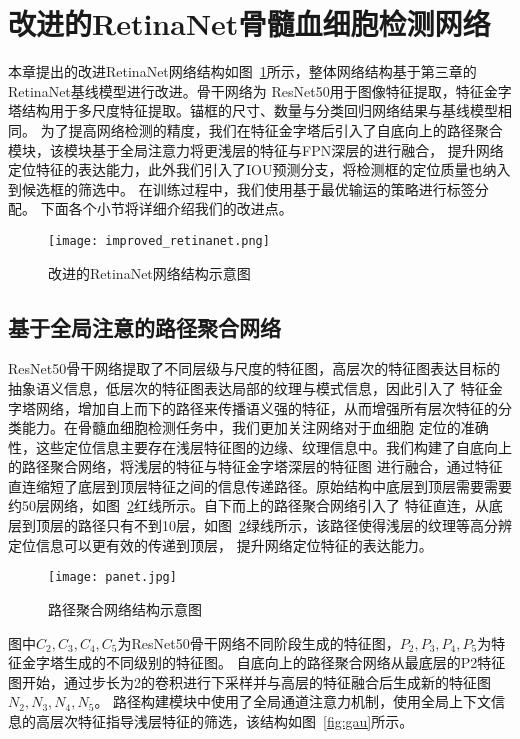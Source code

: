 \section{改进的RetinaNet骨髓血细胞检测网络}
本章提出的改进RetinaNet网络结构如图~\ref{fig:improved_retinanet}所示，整体网络结构基于第三章的RetinaNet基线模型进行改进。骨干网络为
ResNet50用于图像特征提取，特征金字塔结构用于多尺度特征提取。锚框的尺寸、数量与分类回归网络结果与基线模型相同。
为了提高网络检测的精度，我们在特征金字塔后引入了自底向上的路径聚合模块，该模块基于全局注意力将更浅层的特征与FPN深层的进行融合，
提升网络定位特征的表达能力，此外我们引入了IOU预测分支，将检测框的定位质量也纳入到候选框的筛选中。
在训练过程中，我们使用基于最优输运的策略进行标签分配。
下面各个小节将详细介绍我们的改进点。
\begin{figure}[htbp]                     
  \centering                      
  \texttt{[image: improved\_retinanet.png]}                      
  \caption{改进的RetinaNet网络结构示意图}                      
  \label{fig:improved_retinanet}       
\end{figure}  

\subsection{基于全局注意的路径聚合网络}
ResNet50骨干网络提取了不同层级与尺度的特征图，高层次的特征图表达目标的抽象语义信息，低层次的特征图表达局部的纹理与模式信息，因此引入了
特征金字塔网络，增加自上而下的路径来传播语义强的特征，从而增强所有层次特征的分类能力。在骨髓血细胞检测任务中，我们更加关注网络对于血细胞
定位的准确性，这些定位信息主要存在浅层特征图的边缘、纹理信息中。我们构建了自底向上的路径聚合网络，将浅层的特征与特征金字塔深层的特征图
进行融合，通过特征直连缩短了底层到顶层特征之间的信息传递路径。原始结构中底层到顶层需要需要约50层网络，如图~\ref{fig:panet}红线所示。自下而上的路径聚合网络引入了
特征直连，从底层到顶层的路径只有不到10层，如图~\ref{fig:panet}绿线所示，该路径使得浅层的纹理等高分辨定位信息可以更有效的传递到顶层，
提升网络定位特征的表达能力。
\begin{figure}[htbp]                     
  \centering                      
  \texttt{[image: panet.jpg]}                      
  \caption{路径聚合网络结构示意图}                      
  \label{fig:panet}       
\end{figure}  

图中${C_2, C_3, C_4, C_5}$为ResNet50骨干网络不同阶段生成的特征图，${P_2, P_3, P_4, P_5}$为特征金字塔生成的不同级别的特征图。
自底向上的路径聚合网络从最底层的P2特征图开始，通过步长为2的卷积进行下采样并与高层的特征融合后生成新的特征图${N_2, N_3, N_4, N_5}$。
路径构建模块中使用了全局通道注意力机制\cite{li2018pyramid}，使用全局上下文信息的高层次特征指导浅层特征的筛选，该结构如图~\ref{fig:gau}所示。

